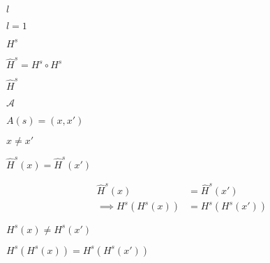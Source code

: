 \documentclass[10pt]{book}
\begin{document}
\begin{mdSnippets}
\begin{mdInlineSnippet}[2db95e8e1a9267b7a1188556b2013b33]
$l$\end{mdInlineSnippet}%
\begin{mdInlineSnippet}[d0e57f3d2c3c3027aec29033bd6f464d]%
$l = 1$\end{mdInlineSnippet}%
\begin{mdInlineSnippet}%
$H^s$\end{mdInlineSnippet}%
\begin{mdInlineSnippet}[8a9356e75cc4b78ee535d9c8c949736e]%
$\hat{H}^s = H^s \circ H^s$\end{mdInlineSnippet}%
\begin{mdInlineSnippet}%
$\hat{H}^s$\end{mdInlineSnippet}%
\begin{mdInlineSnippet}[ad70146b431bea9ae74cf8385470c544]%
$\mathcal{A}$\end{mdInlineSnippet}%
\begin{mdInlineSnippet}[5d6a2ada3be7198e1b0a33c93884d1b3]%
$A(s) = (x,x')$\end{mdInlineSnippet}%
\begin{mdInlineSnippet}%
$x \neq x'$\end{mdInlineSnippet}%
\begin{mdInlineSnippet}[a98f26e8464e4b81fd5c5a35847207cc]%
$\hat{H}^s(x) =  \hat{H}^s(x')$\end{mdInlineSnippet}%
\begin{mdDisplaySnippet}%
\[%
\begin{aligned}
\hat{H}^s(x) &= \hat{H}^s(x') \\
\implies H^s(H^s(x)) &= H^s(H^s(x'))
\end{aligned}
\]%
\end{mdDisplaySnippet}%
\begin{mdInlineSnippet}%
$H^s(x) \neq H^s(x')$\end{mdInlineSnippet}%
\begin{mdInlineSnippet}[06744681444e3ebc7a4578be85e8d474]%
$H^s(H^s(x)) = H^s(H^s(x'))$\end{mdInlineSnippet}%
\begin{mdInlineSnippet}%

\end{mdInlineSnippet}
\end{mdSnippets}
\end{document}
